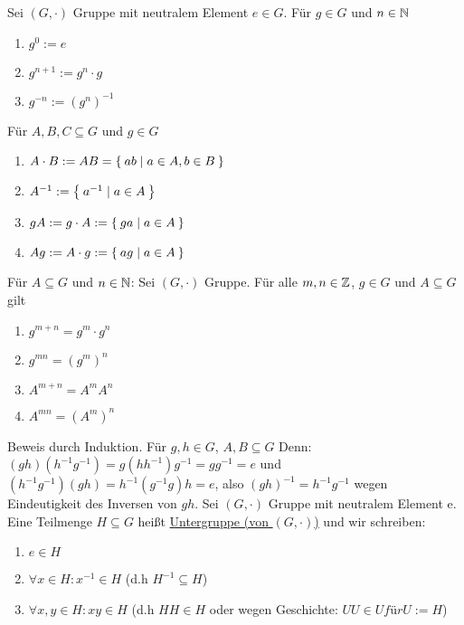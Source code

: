 \documentclass{../../meta/tudscript}
\begin{document}
\setcounter{section}{10}
\setcounter{subsection}{10}
            Sei $(G, \cdot)$ Gruppe mit neutralem Element $e \in G$. 
            Für $g \in G$ und $n \in \mathbb{N}$
            \begin{enumerate}
                \item $g^0 := e$
                \item $g^{n+1} := g^n \cdot g$
                \item $g^{-n} := (g^n)^{-1}$
            \end{enumerate}
            Für $A, B, C \subseteq G$ und $g \in G$
            \begin{enumerate}
                \item $A \cdot B := AB = \Set{ab \mid a \in A, b \in B}$
                \item $A^{-1} := \Set{a^{-1} \mid a \in A}$
                \item $gA := g \cdot A := \Set{ga \mid a \in A}$
                \item $Ag := A \cdot g := \Set{ag \mid a \in A}$
            \end{enumerate}
            Für $A \subseteq G$ und $n \in \mathbb{N}$:
            Sei $(G, \cdot)$ Gruppe. Für alle $m, n \in \mathbb{Z}$, $g \in G$ und $A \subseteq G$ gilt
            \begin{enumerate}
                \item $g^{m+n} = g^m \cdot g^n$
                \item $g^{mn} = (g^m)^n$
                \item $A^{m+n} = A^m A^n$
                \item $A^{mn} = (A^m)^n$
            \end{enumerate}
            Beweis durch Induktion.
            Für $g, h \in G$, $A, B \subseteq G$
            Denn: $(gh)(h^{-1}g^{-1}) = g(h h^{-1})g^{-1} = g g^{-1} = e$ und
            $(h^{-1}g^{-1})(gh) = h^{-1}(g^{-1}g)h = e$, also 
            $(gh)^{-1} = h^{-1}g^{-1}$ wegen Eindeutigkeit des Inversen von $gh$. 
            Sei $(G, \cdot)$ Gruppe mit neutralem Element e. Eine Teilmenge $H \subseteq G$
            heißt \underline{Untergruppe (von $(G, \cdot)$)} und wir schreiben:
            \begin{enumerate}
                \item $e \in H$
                \item $\forall x \in H: x^{-1} \in H$ (d.h $H^{-1} \subseteq H$)
                \item $\forall x,y \in H: xy \in H$ (d.h $HH \in H$ oder wegen Geschichte: $UU \in U für U := H$)
            \end{enumerate}
\end{document}
